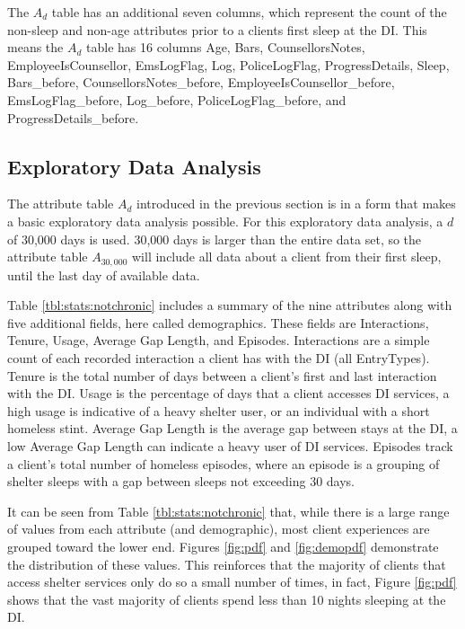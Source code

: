  The $A_d$ table has an additional seven columns, which represent the count of the non-sleep and non-age attributes prior to a clients first sleep at the DI. This means the $A_d$ table has 16 columns Age, Bars, CounsellorsNotes, EmployeeIsCounsellor, EmsLogFlag, Log, PoliceLogFlag, ProgressDetails, Sleep, Bars\_before, CounsellorsNotes\_before, EmployeeIsCounsellor\_before, EmsLogFlag\_before, Log\_before, PoliceLogFlag\_before, and ProgressDetails\_before.


\subsection{Exploratory Data Analysis} \label{chap:data:characteristics}

The attribute table $A_d$ introduced in the previous section is in a form that makes a basic exploratory data analysis possible. For this exploratory data analysis, a $d$ of 30,000 days is used. 30,000 days is larger than the entire data set, so the attribute table $A_{30,000}$ will include all data about a client from their first sleep, until the last day of available data.

Table \ref{tbl:stats:notchronic} includes a summary of the nine attributes along with five additional fields, here called demographics. These fields are Interactions, Tenure, Usage, Average Gap Length, and Episodes. Interactions are a simple count of each recorded interaction a client has with the DI (all EntryTypes). Tenure is the total number of days between a client's first and last interaction with the DI. Usage is the percentage of days that a client accesses DI services, a high usage is indicative of a heavy shelter user, or an individual with a short homeless stint. Average Gap Length is the average gap between stays at the DI, a low Average Gap Length can indicate a heavy user of DI services. Episodes track a client's total number of homeless episodes, where an episode is a grouping of shelter sleeps with a gap between sleeps not exceeding 30 days.

It can be seen from Table \ref{tbl:stats:notchronic} that, while there is a large range of values from each attribute (and demographic), most client experiences are grouped toward the lower end. Figures \ref{fig:pdf} and \ref{fig:demopdf} demonstrate the distribution of these values. This reinforces that the majority of clients that access shelter services only do so a small number of times, in fact, Figure \ref{fig:pdf} shows that the vast majority of clients spend less than 10 nights sleeping at the DI.



